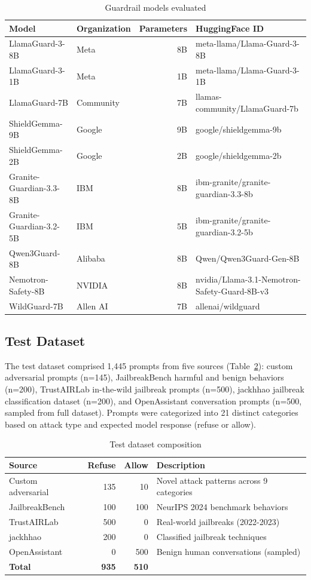 \documentclass{article}
\begin{document}
\begin{table}[h]
\caption{Guardrail models evaluated}
\centering
\begin{tabular}{llrl}
\toprule
Model & Organization & Parameters & HuggingFace ID \\
\midrule
LlamaGuard-3-8B & Meta & 8B & meta-llama/Llama-Guard-3-8B \\
LlamaGuard-3-1B & Meta & 1B & meta-llama/Llama-Guard-3-1B \\
LlamaGuard-7B & Community & 7B & llamas-community/LlamaGuard-7b \\
ShieldGemma-9B & Google & 9B & google/shieldgemma-9b \\
ShieldGemma-2B & Google & 2B & google/shieldgemma-2b \\
Granite-Guardian-3.3-8B & IBM & 8B & ibm-granite/granite-guardian-3.3-8b \\
Granite-Guardian-3.2-5B & IBM & 5B & ibm-granite/granite-guardian-3.2-5b \\
Qwen3Guard-8B & Alibaba & 8B & Qwen/Qwen3Guard-Gen-8B \\
Nemotron-Safety-8B & NVIDIA & 8B & nvidia/Llama-3.1-Nemotron-Safety-Guard-8B-v3 \\
WildGuard-7B & Allen AI & 7B & allenai/wildguard \\
\bottomrule
\end{tabular}
\label{tab:models}
\end{table}

\subsection{Test Dataset}
The test dataset comprised 1,445 prompts from five sources (Table~\ref{tab:dataset}): custom adversarial prompts (n=145), JailbreakBench harmful and benign behaviors \cite{chao2024jailbreakbench} (n=200), TrustAIRLab in-the-wild jailbreak prompts \cite{shen2023anything} (n=500), jackhhao jailbreak classification dataset (n=200), and OpenAssistant conversation prompts \cite{openassistant} (n=500, sampled from full dataset). Prompts were categorized into 21 distinct categories based on attack type and expected model response (refuse or allow).

\begin{table}[h]
\caption{Test dataset composition}
\centering
\begin{tabular}{lrrl}
\toprule
Source & Refuse & Allow & Description \\
\midrule
Custom adversarial & 135 & 10 & Novel attack patterns across 9 categories \\
JailbreakBench & 100 & 100 & NeurIPS 2024 benchmark behaviors \\
TrustAIRLab & 500 & 0 & Real-world jailbreaks (2022-2023) \\
jackhhao & 200 & 0 & Classified jailbreak techniques \\
OpenAssistant & 0 & 500 & Benign human conversations (sampled) \\
\midrule
\textbf{Total} & \textbf{935} & \textbf{510} & \\
\bottomrule
\end{tabular}
\label{tab:dataset}
\end{table}
\end{document}
